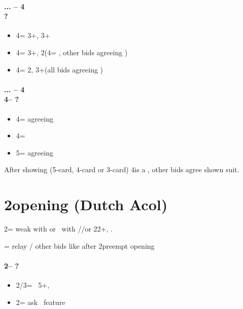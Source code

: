 \documentclass[12pt, a4paper]{report}
\begin{document}
{{{            \subsubsection*{... -- 4\diams\\
                            ?}
            \begin{itemize}
                \item 4\hearts = 3+\clubs, 3+\diams
                \item 4\spades = 3+\clubs, 2\diams (4\nt = \soff, other bids agreeing \clubs)
                \item 4\nt = 2\clubs, 3+\diams (all bids agreeing \diams)
            \end{itemize}

            \subsubsection*{... -- 4\diams\\
                            4\hearts -- ?}
            \begin{itemize}
                \item 4\spades = agreeing \clubs
                \item 4\nt = \soff
                \item 5\clubs = agreeing \diams
            \end{itemize}

            \vspace{0.5cm}

            After showing \minor (5-card, 4-card or 3-card) 4\nt is a \soff, other bids
            agree shown suit.
        }

    }

    \chapter*{\colorbox{Plum!30}{2\clubs opening (Dutch Acol)}}
     {

        2\clubs = weak with \diams or \gf\ with \clubs/\hearts/\spades or 22+, \bal.
        
        \diams = relay / other bids like after 2\diams preempt opening

        \subsubsection*{2\clubs -- ?}
        \begin{itemize}
            \item 2\major/3\minor = \nat\ 5+, \fonce
            \item 2\nt = ask \nt\ feature
        \end{itemize}

}}
\end{document}
